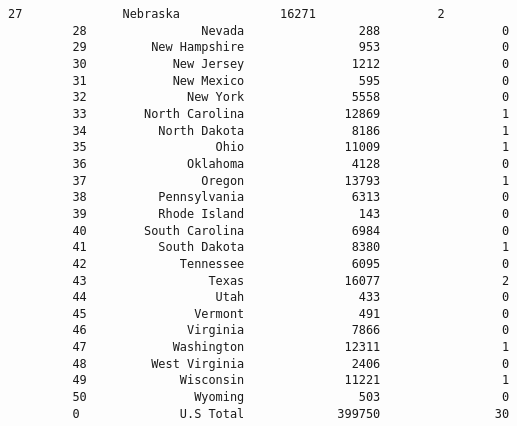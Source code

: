 \documentclass[11pt]{article}
\begin{document}
\begin{Verbatim}[commandchars=\\\{\}]
         27              Nebraska              16271                 2   
         28                Nevada                288                 0   
         29         New Hampshire                953                 0   
         30            New Jersey               1212                 0   
         31            New Mexico                595                 0   
         32              New York               5558                 0   
         33        North Carolina              12869                 1   
         34          North Dakota               8186                 1   
         35                  Ohio              11009                 1   
         36              Oklahoma               4128                 0   
         37                Oregon              13793                 1   
         38          Pennsylvania               6313                 0   
         39          Rhode Island                143                 0   
         40        South Carolina               6984                 0   
         41          South Dakota               8380                 1   
         42             Tennessee               6095                 0   
         43                 Texas              16077                 2   
         44                  Utah                433                 0   
         45               Vermont                491                 0   
         46              Virginia               7866                 0   
         47            Washington              12311                 1   
         48         West Virginia               2406                 0   
         49             Wisconsin              11221                 1   
         50               Wyoming                503                 0   
         0              U.S Total             399750                30   
         

\end{Verbatim}
\end{document}
